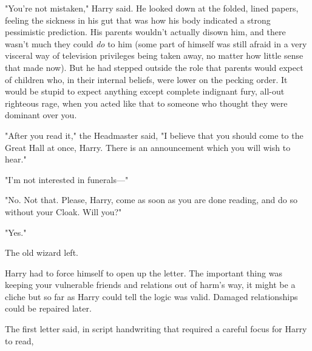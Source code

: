 "You're not mistaken," Harry said. He looked down at the folded, lined papers,
feeling the sickness in his gut that was how his body indicated a strong
pessimistic prediction. His parents wouldn't actually disown him, and there
wasn't much they could \emph{do} to him (some part of himself was still afraid
in a very visceral way of television privileges being taken away, no matter how
little sense that made now). But he had stepped outside the role that parents
would expect of children who, in their internal beliefs, were lower on the
pecking order. It would be stupid to expect anything except complete indignant
fury, all-out righteous rage, when you acted like that to someone who thought
they were dominant over you.

"After you read it," the Headmaster said, "I believe that you should come to
the Great Hall at once, Harry. There is an announcement which you will wish to
hear."

"I'm not interested in funerals—"

"No. Not that. Please, Harry, come as soon as you are done reading, and do so
without your Cloak. Will you?"

"Yes."

The old wizard left.

Harry had to force himself to open up the letter. The important thing was
keeping your vulnerable friends and relations out of harm's way, it might be a
cliche but so far as Harry could tell the logic was valid. Damaged
relationships could be repaired later.

The first letter said, in script handwriting that required a careful focus for
Harry to read,

